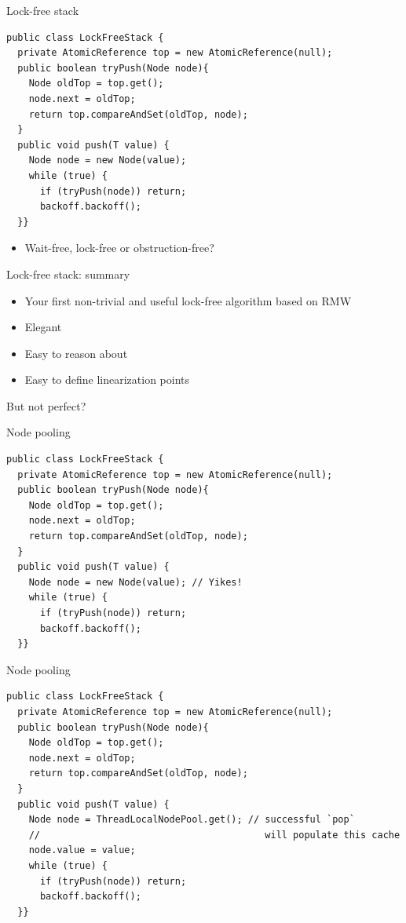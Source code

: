 \begin{frame}[fragile]{Lock-free stack}
\begin{verbatim}
public class LockFreeStack {
  private AtomicReference top = new AtomicReference(null); 
  public boolean tryPush(Node node){
    Node oldTop = top.get();    
    node.next = oldTop;
    return top.compareAndSet(oldTop, node);
  }
  public void push(T value) {
    Node node = new Node(value); 
    while (true) {
      if (tryPush(node)) return;
      backoff.backoff();
  }}
\end{verbatim}

\pause
\begin{itemize}
  \item Wait-free, lock-free or obstruction-free?
\end{itemize}

\end{frame}

\begin{frame}[fragile]{Lock-free stack: summary}

\begin{itemize}
  \item Your first non-trivial and useful lock-free algorithm based on RMW
  \item Elegant
  \item Easy to reason about
  \item Easy to define linearization points
\end{itemize}

\pause

But not perfect?

\end{frame}

\begin{frame}[fragile]{Node pooling}

\begin{verbatim}
public class LockFreeStack {
  private AtomicReference top = new AtomicReference(null); 
  public boolean tryPush(Node node){
    Node oldTop = top.get();    
    node.next = oldTop;
    return top.compareAndSet(oldTop, node);
  }
  public void push(T value) {
    Node node = new Node(value); // Yikes!
    while (true) {
      if (tryPush(node)) return;
      backoff.backoff();
  }}
\end{verbatim}

\end{frame}


\begin{frame}{Node pooling}

\begin{verbatim}
public class LockFreeStack {
  private AtomicReference top = new AtomicReference(null); 
  public boolean tryPush(Node node){
    Node oldTop = top.get();    
    node.next = oldTop;
    return top.compareAndSet(oldTop, node);
  }
  public void push(T value) {
    Node node = ThreadLocalNodePool.get(); // successful `pop` 
    //                                        will populate this cache
    node.value = value;
    while (true) {
      if (tryPush(node)) return;
      backoff.backoff();
  }}
\end{verbatim}
\end{frame}


